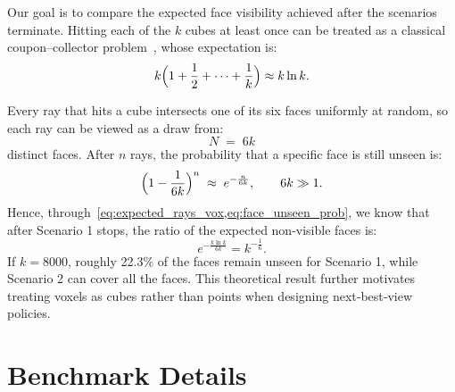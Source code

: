 Our goal is to compare the expected face visibility achieved after the scenarios terminate.
Hitting each of the \(k\) cubes at least once can be treated as a classical coupon–collector problem~\cite{boneh1997coupon}, whose expectation is:
\begin{equation}
  k\Bigl(1+\frac{1}{2}+\dots+\frac{1}{k}\Bigr)
    \approx k\ln k .
  \label{eq:expected_rays_vox}
\end{equation}

Every ray that hits a cube intersects one of its six faces uniformly at random, so each ray can be viewed as a draw from:
\begin{equation}
  N \;=\; 6k
  \label{eq:total_faces}
\end{equation}
distinct faces.
After \(n\) rays, the probability that a specific face is still unseen is:
\begin{equation}
  \Bigl(1-\frac{1}{6k}\Bigr)^{n}
    \;\approx\;
    e^{-\frac{n}{6k}},
  \qquad 6k\gg 1.
  \label{eq:face_unseen_prob}
\end{equation}
Hence, through~\cref{eq:expected_rays_vox,eq:face_unseen_prob}, we know that after Scenario 1 stops, the ratio of the expected non-visible faces is: 
\begin{equation}
    e^{-\frac{ k\ln k}{6k}} = k^{-\frac{1}{6}}.
  \label{eq:face_unseen_ratio}
\end{equation}
If \(k=8000\), roughly 22.3\% of the faces remain unseen for Scenario 1, while Scenario 2 can cover all the faces. 
This theoretical result further motivates treating voxels as cubes rather than points when designing next‑best‑view policies.

\section{Benchmark Details}
\label{asec:bench}

